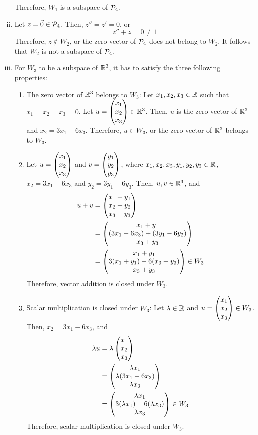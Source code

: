 \begin{sol}
\begin{enumerate}[(i)]
\begin{enumerate}[(1)]
        \end{enumerate}
        Therefore, $W_1$ is a subspace of $\P_4$.
        \item Let $z=\Vec{0}\in\P_4$. Then, $z''=z'=0$, or
        \[
            z''+z=0\not=1
        \]
        Therefore, $z\not\in W_2$, or the zero vector of $\P_4$ does not belong to $W_2$. It follows that $W_2$ is not a subspace of $\P_4$.
        \item For $W_3$ to be a subspace of $\R^{3}$, it has to satisfy the three following properties:
        \begin{enumerate}[(1)]
            \item The zero vector of $\R^{3}$ belongs to $W_3$: Let $x_1,x_2,x_3\in\R$ such that $x_1=x_2=x_3=0$. Let $u=\colvecthree{x_1}{x_2}{x_3}\in\R^{3}$. Then, $u$ is the zero vector of $\R^{3}$ and $x_2=3x_1-6x_3$. Therefore, $u\in W_3$, or the zero vector of $\R^{3}$ belongs to $W_3$.
            \item Let $u=\colvecthree{x_1}{x_2}{x_3}$ and $v=\colvecthree{y_1}{y_2}{y_3}$, where $x_1,x_2,x_3,y_1,y_2,y_3\in\R$, $x_2=3x_1-6x_3$ and $y_2=3y_1-6y_3$. Then, $u,v\in\R^{3}$, and
            \[
                \begin{aligned}
                    u+v & = \colvecthree{x_1+y_1}{x_2+y_2}{x_3+y_3}                      \\
                        & = \colvecthree{x_1+y_1}{(3x_1-6x_3)+(3y_1-6y_2)}{x_3+y_3}       \\
                        & = \colvecthree{x_1+y_1}{3(x_1+y_1)-6(x_3+y_3)}{x_3+y_3}\in W_3
                \end{aligned}
            \]
            Therefore, vector addition is closed under $W_3$.
            \item Scalar multiplication is closed under $W_3$: Let $\lam\in\R$ and $u=\colvecthree{x_1}{x_2}{x_3}\in W_3$. Then, $x_2=3x_1-6x_3$, and
            \[
                \begin{aligned}
                    \lam u & = \lam\colvecthree{x_1}{x_2}{x_3}                                  \\
                            & = \colvecthree{\lam x_1}{\lam (3x_1-6x_3)}{\lam x_3}               \\
                            & = \colvecthree{\lam x_1}{3(\lam x_1)-6(\lam x_3)}{\lam x_3}\in W_3
                \end{aligned}
            \]
            Therefore, scalar multiplication is closed under $W_3$.
        \end{enumerate}

\end{enumerate}
\end{sol}
